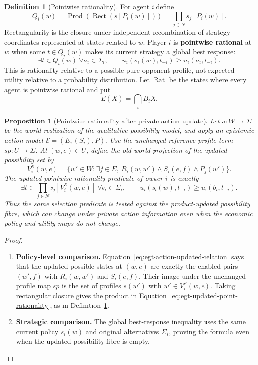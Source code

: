 \documentclass[11pt,a4paper]{article}
\numberwithin{equation}{section}
\newtheorem{proposition}[theorem]{Proposition}
\theoremstyle{definition}
\newtheorem{definition}[theorem]{Definition}
\theoremstyle{remark}
\theoremstyle{plain}
\begin{document}
\begin{definition}[Pointwise rationality]
\label{def:egt-pointwise-rationality}
For agent $i$ define
\[
 Q_i(w)
 =\operatorname{Prod}\!\left(\operatorname{Rect}(s[P_i(w)])\right)
 =\prod_{j\in N}s_j[P_i(w)].
\]
Rectangularity is the closure under independent recombination of strategy coordinates represented at states related to $w$. Player $i$ is \textbf{pointwise rational} at $w$ when
some $t\in Q_i(w)$ makes its current strategy a global best response:
\begin{equation}
\label{eq:egt-point-rat}
 \exists t\in Q_i(w)\ \forall a_i\in\Sigma_i,\qquad
 u_i(s_i(w),t_{-i})\geq u_i(a_i,t_{-i}).
\end{equation}
This is rationality relative to a possible pure opponent profile, not expected
utility relative to a probability distribution. Let $\operatorname{Rat}$ be
the states where every agent is pointwise rational and put
\[
 E(X)=\bigcap_iB_iX.
\]
\end{definition}

\begin{proposition}[Pointwise rationality after private action update]
\label{prop:egt-action-point-rationality}
Let $s:W\to\Sigma$ be the world realization of the qualitative
possibility model, and apply an epistemic action model
$\mathcal E=(E,(S_i),P)$. Use the unchanged reference-profile term
$sp:U\to\Sigma$. At $(w,e)\in U$, define the old-world projection of
the updated possibility set by
\[
 V_i^{\mathcal E}(w,e)=
 \{w'\in W:\exists f\in E,\ 
       R_i(w,w')\wedge S_i(e,f)\wedge P_f(w')\}.
\]
The updated pointwise-rationality predicate of owner $i$ is exactly
\begin{equation}\label{eq:egt-updated-point-rationality}
 \exists t\in\prod_{j\in N}s_j[V_i^{\mathcal E}(w,e)]\ 
 \forall b_i\in\Sigma_i,\qquad
 u_i(s_i(w),t_{-i})\geq u_i(b_i,t_{-i}).
\end{equation}
Thus the same selection predicate is tested against the product-updated
possibility fibre, which can change under private action information
even when the economic policy and utility maps do not change.
\end{proposition}
\begin{proof}
\leavevmode
\begin{enumerate}[label=\textup{(\arabic*)},leftmargin=*,itemsep=4pt,topsep=3pt]
  \item \textbf{Policy-level comparison.} Equation~\eqref{eq:egt-action-updated-relation} says that the
updated possible states at $(w,e)$ are exactly the enabled pairs
$(w',f)$ with $R_i(w,w')$ and $S_i(e,f)$. Their image under the
unchanged profile map $sp$ is the set of profiles $s(w')$ with
$w'\in V_i^{\mathcal E}(w,e)$. Taking rectangular closure gives the
product in Equation~\eqref{eq:egt-updated-point-rationality}, as in
Definition~\ref{def:egt-pointwise-rationality}.
  \item \textbf{Strategic comparison.} The global best-response
inequality uses the same current policy $s_i(w)$ and original
alternatives $\Sigma_i$, proving the formula even when the updated
possibility fibre is empty.
\end{enumerate}
\end{proof}
\end{document}
